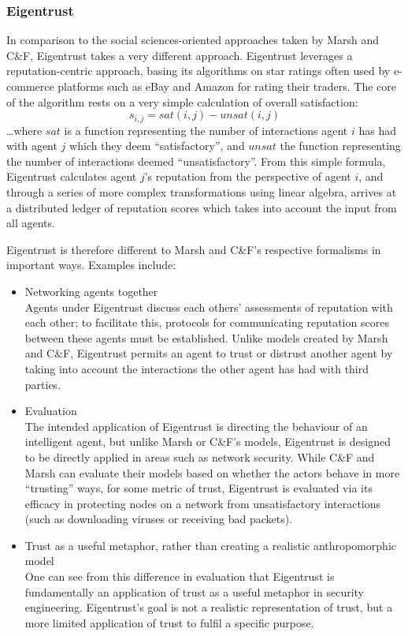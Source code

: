 \subsubsection*{Eigentrust}\label{sec:eigentrust}
In comparison to the social sciences-oriented approaches taken by Marsh and C\&F, Eigentrust\cite{Kamvar2003} takes a very different approach. Eigentrust leverages a reputation-centric approach, basing its algorithms on star ratings often used by e-commerce platforms such as eBay and Amazon for rating their traders. The core of the algorithm rests on a very simple calculation of overall satisfaction:
\[s_{i, j} = sat(i, j) - unsat(i, j)\]
\ldots{}where \(sat\) is a function representing the number of interactions agent \(i\) has had with agent \(j\) which they deem ``satisfactory'', and \(unsat\) the function representing the number of interactions deemed ``unsatisfactory''. From this simple formula, Eigentrust calculates agent \(j\)'s reputation from the perspective of agent \(i\), and through a series of more complex transformations using linear algebra, arrives at a distributed ledger of reputation scores which takes into account the input from all agents.\par

Eigentrust is therefore different to Marsh and C\&F's respective formalisms in important ways. Examples include:
\begin{itemize}
    \item Networking agents together\\
        Agents under Eigentrust discuss each others' assessments of reputation with each other; to facilitate this, protocols for communicating reputation scores between these agents must be established. Unlike models created by Marsh and C\&F, Eigentrust permits an agent to trust or distrust another agent by taking into account the interactions the other agent has had with third parties.
    \item Evaluation\\
        The intended application of Eigentrust is directing the behaviour of an intelligent agent, but unlike Marsh or C\&F's models, Eigentrust is designed to be directly applied in areas such as network security. While C\&F and Marsh can evaluate their models based on whether the actors behave in more ``trusting'' ways, for some metric of trust, Eigentrust is evaluated via its efficacy in protecting nodes on a network from unsatisfactory interactions (such as downloading viruses or receiving bad packets).
    \item Trust as a useful metaphor, rather than creating a realistic anthropomorphic model\\
        One can see from this difference in evaluation that Eigentrust is fundamentally an application of trust as a useful metaphor in security engineering. Eigentrust's goal is not a realistic representation of trust, but a more limited application of trust to fulfil a specific purpose. 
\end{itemize}

